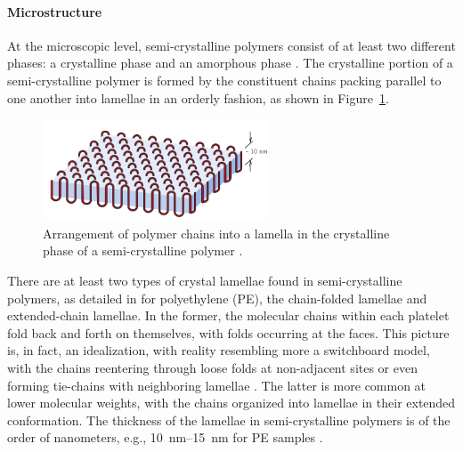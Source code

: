 \paragraph{Microstructure}
At the microscopic level, semi-crystalline polymers consist of at least two different phases: a crystalline phase and an amorphous phase \citep{khouryMorphologyCrystallineSynthetic1976}.
The crystalline portion of a semi-crystalline polymer is formed by the constituent chains packing parallel to one another into lamellae in an orderly fashion, as shown in Figure~\ref {fig:crystalline_phase_of_scp}.

\begin{figure}[htbp]
  \centering
	\includegraphics[width=0.6\textwidth]{figures/crystalline_phase_of_scp}
	\caption{Arrangement of polymer chains into a lamella in the crystalline phase of a semi-crystalline polymer \citep{callister2014materials}.}
\label{fig:crystalline_phase_of_scp}
\end{figure}

There are at least two types of crystal lamellae found in semi-crystalline polymers, as detailed in \cite{andersonMorphologyIsothermallyBulk1964} for polyethylene (PE), the chain-folded lamellae and extended-chain lamellae.
In the former, the molecular chains within each platelet fold back and forth on themselves, with folds occurring at the faces.
This picture is, in fact, an idealization, with reality resembling more a switchboard model, with the chains reentering through loose folds at non-adjacent sites or even forming tie-chains with neighboring lamellae \citep{gsellEvolutionMicrostructureSemicrystalline1994}.
The latter is more common at lower molecular weights, with the chains organized into lamellae in their extended conformation.
The thickness of the lamellae in semi-crystalline polymers is of the order of nanometers, e.g., \SIrange{10}{15}{\nano\meter} for PE samples \citep{argonPhysicsDeformationFracture2013a}.


